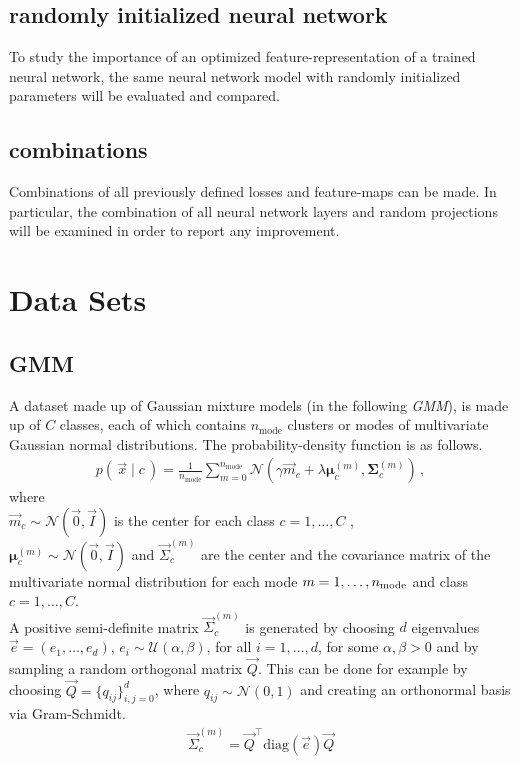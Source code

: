 \subsection{randomly initialized neural network}
To study the importance of an optimized feature-representation of a trained neural network, 
the same neural network model with randomly initialized parameters will be evaluated and compared.

\subsection{combinations}
Combinations of all previously defined losses and feature-maps can be made. In particular, the combination of all neural network layers and random projections will be examined in order to report any improvement.


\section{Data Sets}
\label{sec:datasets}

\subsection{GMM}
\label{sec:datasetgmm}
A dataset made up of Gaussian mixture models (in the following \textit{GMM}), 
is made up of $C$ classes, each of which contains $n_\text{mode}$ clusters or modes of multivariate Gaussian normal distributions. The probability-density function is as follows.
\begin{align}
\label{eqn:gmmdistr}
    p(\, \vec x \mid c \,) = \frac 1 {n_\text{mode}} \sum _{m=0}^{n_\text{mode}}
    \mathcal N (\gamma \vec m_c + \lambda \boldsymbol \mu_c^{(m)}, \boldsymbol \Sigma_c^{(m)}) \, ,
\end{align}
where \\
$\vec m_c \sim \mathcal N (\vec 0, \vec I)$ is the center for each class $c=1,\ldots, C$ ,\\
$\boldsymbol \mu_c^{(m)} \sim \mathcal N (\vec 0, \vec I)$ and
$\vec \Sigma_c^{(m)}$ are the center and the covariance matrix of the multivariate normal distribution
for each mode $m=1,\ldots, n_{\textnormal{mode}}$ and class $c=1,\ldots, C$.  \\
A positive semi-definite matrix $\vec \Sigma_c^{(m)}$ is generated by choosing $d$ eigenvalues $\vec e = (e_1, \ldots, e_d)$, $e_i \sim \mathcal U(\alpha, \beta)$, for all $i=1, \ldots, d$, for some $\alpha, \beta > 0$ and 
by sampling a random orthogonal matrix $\vec Q$. 
This can be done for example by choosing $\vec Q = \{q_{ij}\}_{i,j=0}^{d}$, 
where $q_{ij} \sim \mathcal N(0, 1)$
and creating an orthonormal basis via Gram-Schmidt. 
\begin{align*}
    \vec \Sigma_c^{(m)} = \vec Q^\top \text{diag}(\vec e) \vec Q
\end{align*}


